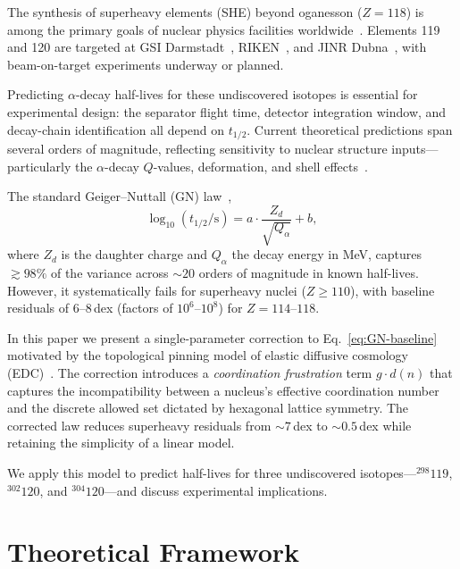 \documentclass[aps,prc,twocolumn,showpacs,preprintnumbers,amsmath,amssymb]{revtex4-2}
\newcommand{\thalf}{t_{1/2}}
\newcommand{\Qalpha}{Q_\alpha}
\newcommand{\Zd}{Z_d}
\newcommand{\dn}{d(n)}
\begin{document}
The synthesis of superheavy elements (SHE) beyond oganesson ($Z =
118$) is among the primary goals of nuclear physics
facilities worldwide~\cite{Oganessian2015,Nazarewicz2018}.
Elements 119 and 120 are targeted at GSI
Darmstadt~\cite{GSI2024}, RIKEN~\cite{RIKEN2024}, and JINR
Dubna~\cite{Dubna2024}, with beam-on-target experiments
underway or planned.

Predicting $\alpha$-decay half-lives for these undiscovered
isotopes is essential for experimental design: the separator
flight time, detector integration window, and decay-chain
identification all depend on $\thalf$.  Current theoretical
predictions span several orders of magnitude, reflecting
sensitivity to nuclear structure inputs---particularly the
$\alpha$-decay $Q$-values, deformation, and shell
effects~\cite{Sobiczewski2018,Bao2015}.

The standard Geiger--Nuttall (GN) law~\cite{Geiger1911,Gamow1928},
\begin{equation}
  \log_{10}(\thalf/\text{s}) = a \cdot \frac{\Zd}{\sqrt{\Qalpha}}
    + b,
  \label{eq:GN-baseline}
\end{equation}
where $\Zd$ is the daughter charge and $\Qalpha$ the decay
energy in MeV, captures $\gtrsim 98\%$ of the variance across
$\sim 20$ orders of magnitude in known half-lives.  However, it
systematically fails for superheavy nuclei ($Z \geq 110$), with
baseline residuals of $6$--$8$\,dex (factors of $10^6$--$10^8$)
for $Z = 114$--$118$.

In this paper we present a single-parameter correction to
Eq.~\eqref{eq:GN-baseline} motivated by the topological pinning
model of elastic diffusive cosmology
(EDC)~\cite{EDCPartI,EDCPaper2,EDCBook4}.  The correction introduces a
\emph{coordination frustration} term $g \cdot \dn$ that captures
the incompatibility between a nucleus's effective coordination
number and the discrete allowed set dictated by hexagonal lattice
symmetry.  The corrected law reduces superheavy residuals from
$\sim 7$\,dex to $\sim 0.5$\,dex while retaining the simplicity
of a linear model.

We apply this model to predict half-lives for three undiscovered
isotopes---${}^{298}119$, ${}^{302}120$, and
${}^{304}120$---and discuss experimental implications.

\section{Theoretical Framework}
\label{sec:theory}
\end{document}
